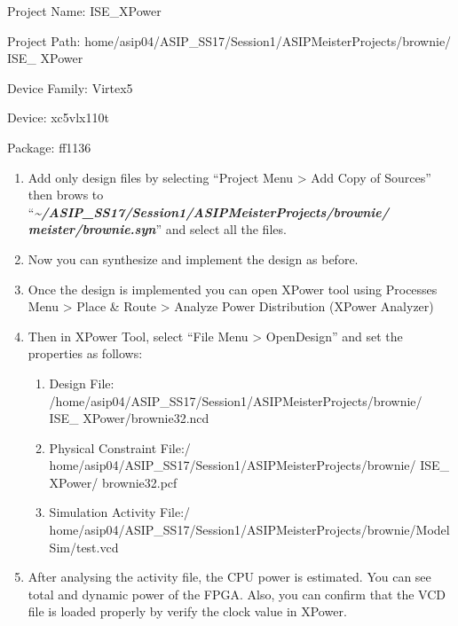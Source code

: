 \documentclass[
]{article}
\begin{document}
Project Name: ISE\_XPower

Project Path:
home/asip04/ASIP\_SS17/Session1/ASIPMeisterProjects/brownie/ ISE\_
XPower

Device Family: Virtex5

Device: xc5vlx110t

Package: ff1136

\begin{enumerate}
\def\labelenumi{\arabic{enumi}.}
\setcounter{enumi}{26}
\item
  Add only design files by selecting ``Project Menu \textgreater{} Add
  Copy of Sources'' then brows to
  ``\emph{\textbf{\textasciitilde/ASIP\_SS17/Session1/ASIPMeisterProjects/brownie/
  meister/brownie.syn}}'' and select all the files.
\item
  Now you can synthesize and implement the design as before.
\item
  Once the design is implemented you can open XPower tool using
  Processes Menu \textgreater{} Place \& Route \textgreater{} Analyze
  Power Distribution (XPower Analyzer)
\item
  Then in XPower Tool, select ``File Menu \textgreater{} OpenDesign''
  and set the properties as follows:

  \begin{enumerate}
  \def\labelenumii{\alph{enumii}.}
  \item
    Design File:
    /home/asip04/ASIP\_SS17/Session1/ASIPMeisterProjects/brownie/ ISE\_
    XPower/brownie32.ncd
  \item
    Physical Constraint File:/
    home/asip04/ASIP\_SS17/Session1/ASIPMeisterProjects/brownie/ ISE\_
    XPower/ brownie32.pcf
  \item
    Simulation Activity File:/
    home/asip04/ASIP\_SS17/Session1/ASIPMeisterProjects/brownie/ModelSim/test.vcd
  \end{enumerate}
\item
  After analysing the activity file, the CPU power is estimated. You can
  see total and dynamic power of the FPGA. Also, you can confirm that
  the VCD file is loaded properly by verify the clock value in XPower.
\end{enumerate}
\end{document}
